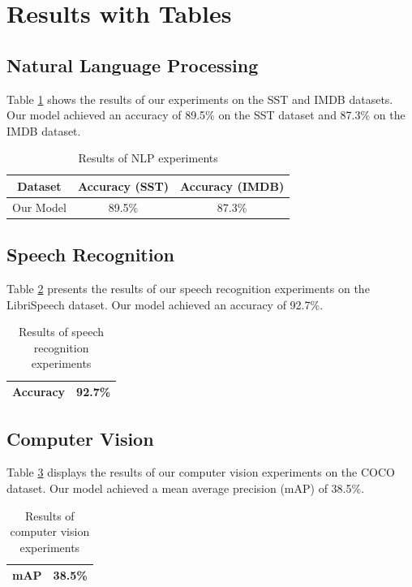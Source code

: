 \documentclass{article}
\begin{document}
\section{Results with Tables}
\subsection{Natural Language Processing}
Table \ref{tab:nlp_results} shows the results of our experiments on the SST and IMDB datasets. Our model achieved an accuracy of 89.5\% on the SST dataset and 87.3\% on the IMDB dataset.

\begin{table}[ht]
\centering
\begin{tabular}{|c|c|c|}
\hline
Dataset & Accuracy (SST) & Accuracy (IMDB) \\
\hline
Our Model & 89.5\% & 87.3\% \\
\hline
\end{tabular}
\caption{Results of NLP experiments}
\label{tab:nlp_results}
\end{table}

\subsection{Speech Recognition}
Table \ref{tab:speech_results} presents the results of our speech recognition experiments on the LibriSpeech dataset. Our model achieved an accuracy of 92.7\%.

\begin{table}[ht]
\centering
\begin{tabular}{|c|c|}
\hline
Accuracy & 92.7\% \\
\hline
\end{tabular}
\caption{Results of speech recognition experiments}
\label{tab:speech_results}
\end{table}

\subsection{Computer Vision}
Table \ref{tab:cv_results} displays the results of our computer vision experiments on the COCO dataset. Our model achieved a mean average precision (mAP) of 38.5\%.

\begin{table}[ht]
\centering
\begin{tabular}{|c|c|}
\hline
mAP & 38.5\% \\
\hline
\end{tabular}
\caption{Results of computer vision experiments}
\label{tab:cv_results}
\end{table}
\end{document}
